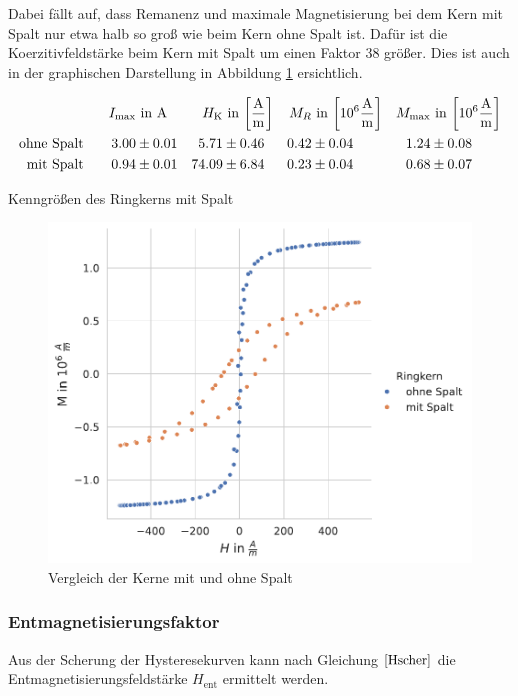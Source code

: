 \documentclass[12pt,a4paper]{scrartcl}
\numberwithin{equation}{section} %
\renewcommand{\[}{} %
\renewcommand{\]}{\noindent} %
\begin{document}
Dabei fällt auf, dass Remanenz und maximale Magnetisierung bei dem Kern mit Spalt nur etwa halb so groß wie beim Kern ohne Spalt ist. Dafür ist die Koerzitivfeldstärke beim Kern mit Spalt um einen Faktor \(38\) größer. Dies ist auch in der graphischen Darstellung in Abbildung \ref{Abb: Vergleich} ersichtlich.

\begin{table}
\begin{align*}
	I_\mathrm{max} &\text{ in } \mathrm A &
		H_\mathrm{K} &\text{ in }
			{\tiny \left[ \frac{\mathrm A}{\mathrm m} \right] } &
		M_R &\text{ in }
		{\tiny \left[10^6 \frac{\mathrm A}{\mathrm m} \right] } &
		M_\mathrm{max} &\text{ in }
		{\tiny \left[10^6 \frac{\mathrm A}{\mathrm m} \right] }
		\\
	\text{ohne Spalt}\qquad
		3.00 &\pm 0.01 &
		5.71 &\pm 0.46 &
		0.42 &\pm 0.04 &
		1.24 &\pm 0.08
		\\
	\text{mit Spalt}\qquad
		0.94 &\pm 0.01 &
		74.09 &\pm 6.84 &
		0.23 &\pm 0.04 &
		0.68 &\pm 0.07
\end{align*}
\caption{Kenngrößen des Ringkerns mit Spalt}
\label{Tab: kenngr Spalt}
\end{table}

\begin{figure}
\centering
\includegraphics[scale=0.7]{../media/B2.4/3.3.3_comparison.pdf}
\caption{Vergleich der Kerne mit und ohne Spalt}
\label{Abb: Vergleich}
\end{figure}

\hypertarget{entmagnetisierungsfaktor-2}{%
\subsubsection{Entmagnetisierungsfaktor}\label{entmagnetisierungsfaktor-2}}
Aus der Scherung der Hysteresekurven kann nach Gleichung \(\eqref{Hscher}\) die Entmagnetisierungsfeldstärke \(H_\mathrm{ent}\) ermittelt werden.
\end{document}
